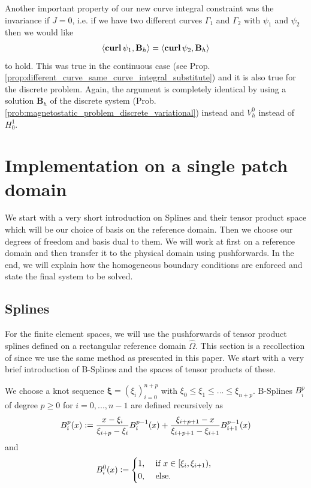 \documentclass[../master_thesis.tex]{subfiles}
\begin{document}
Another important property of our new curve integral constraint was the 
invariance if $J=0$, i.e. if we have two different curves 
$\Gamma_1$ and $\Gamma_2$ with $\psi_1$ and $\psi_2$ then we would like
\begin{align*}
    \langle \veccurl \psi_1, \mathbf{B}_h \rangle = \langle \veccurl \psi_2, \mathbf{B}_h \rangle
\end{align*}
to hold.
This was 
true in the continuous case (see Prop.\,\ref{prop:different_curve_same_curve_integral_substitute}) 
and it is also true for the discrete 
problem. Again, the argument is completely identical by using a solution $\mathbf{B}_h$ 
of the discrete system (Prob.\,\ref{prob:magnetostatic_problem_discrete_variational}) 
instead and $V_h^0$ instead of $H^1_0$.

\section{Implementation on a single patch domain}\label{sec:implementation}

We start with a very short introduction on Splines and their tensor product space which 
will be our choice of basis on the reference domain. Then we 
choose our degrees of freedom and basis dual to them. We will work at first 
on a reference domain and then transfer it to the physical domain 
using pushforwards. In the end, we will explain how the homogeneous boundary 
conditions are enforced and state the final system to be solved.

\subsection{Splines}

For the finite element spaces, we will use the pushforwards of tensor product splines 
defined on a rectangular reference domain $\hat{\Omega}$. This section is a recollection 
of \cite[Sec. 4.2]{multipatch_paper} 
since we use the same method as presented in this paper.  
We start with a very brief introduction of B-Splines and the spaces of tensor products 
of these.

We choose a knot sequence $\bm{\xi} = (\xi_i )_{i=0}^{n+p}$ with 
$\xi_0 \leq \xi_1 \leq ... \leq \xi_{n+p}$. 
B-Splines $B^p_i$ of degree $p\geq 0$ for $i = 0,...,n-1$ are defined recursively as 
\begin{align*}
    B^p_{i}(x) \vcentcolon= \frac{x - \xi_i}{\xi_{i+p}- \xi_i} B_i^{p-1}(x) 
        + \frac{\xi_{i+p+1} - x}{\xi_{i+p+1}- \xi_{i+1}} B_{i+1}^{p-1}(x) 
\end{align*}
and 
\begin{align*}
    B^0_i(x) \vcentcolon= \begin{cases*}
        1, & \text{ if $x \in [\xi_i,\xi_{i+1})$},
        \\0, & \text{ else.}
    \end{cases*}
\end{align*}
\end{document}
